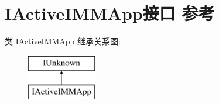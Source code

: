 \hypertarget{interface_i_active_i_m_m_app}{}\section{I\+Active\+I\+M\+M\+App接口 参考}
\label{interface_i_active_i_m_m_app}
类 I\+Active\+I\+M\+M\+App 继承关系图\+:\begin{figure}[H]
\begin{center}
\leavevmode
\includegraphics[height=2.000000cm]{interface_i_active_i_m_m_app}
\end{center}
\end{figure}
